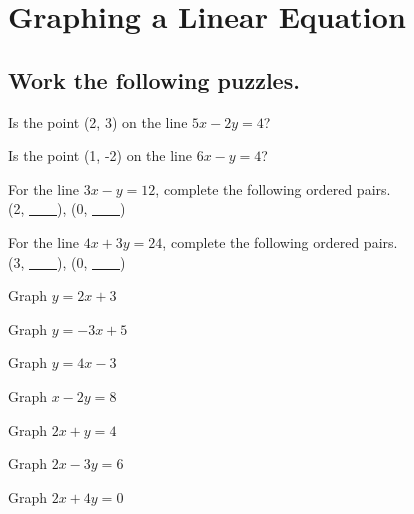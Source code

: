 \section{Graphing a Linear Equation}

\subsection*{Work the following puzzles.}

\begin{puzzle}
    Is the point (2, 3) on the line \(5x - 2y = 4\)?
\end{puzzle}

\begin{puzzle}
    Is the point (1, -2) on the line \(6x - y = 4\)?
\end{puzzle}

\begin{puzzle}
    For the line \(3x - y = 12\), complete the following ordered pairs.\\
    (2, \underline{~~~~}), (0, \underline{~~~~})
\end{puzzle}

\begin{puzzle}
    For the line \(4x + 3y = 24\), complete the following ordered pairs.\\
    (3, \underline{~~~~}), (0, \underline{~~~~})
\end{puzzle}

\begin{puzzle}
    Graph \(y = 2x + 3\)
\end{puzzle}

\begin{puzzle}
    Graph \(y = -3x + 5\)
\end{puzzle}

\begin{puzzle}
    Graph \(y = 4x - 3\)
\end{puzzle}

\begin{puzzle}
    Graph \(x - 2y = 8\)
\end{puzzle}

\begin{puzzle}
    Graph \(2x + y = 4\)
\end{puzzle}

\begin{puzzle}
    Graph \(2x - 3y = 6\)
\end{puzzle}

\begin{puzzle}
    Graph \(2x + 4y = 0\)
\end{puzzle}


